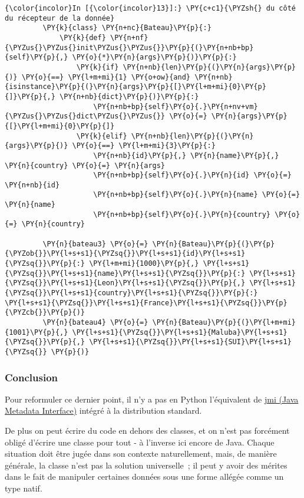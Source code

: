     \begin{Verbatim}[commandchars=\\\{\},frame=single,framerule=0.3mm,rulecolor=\color{cellframecolor}]
{\color{incolor}In [{\color{incolor}13}]:} \PY{c+c1}{\PYZsh{} du côté du récepteur de la donnée}
         \PY{k}{class} \PY{n+nc}{Bateau}\PY{p}{:}
             \PY{k}{def} \PY{n+nf}{\PYZus{}\PYZus{}init\PYZus{}\PYZus{}}\PY{p}{(}\PY{n+nb+bp}{self}\PY{p}{,} \PY{o}{*}\PY{n}{args}\PY{p}{)}\PY{p}{:}
                 \PY{k}{if} \PY{n+nb}{len}\PY{p}{(}\PY{n}{args}\PY{p}{)} \PY{o}{==} \PY{l+m+mi}{1} \PY{o+ow}{and} \PY{n+nb}{isinstance}\PY{p}{(}\PY{n}{args}\PY{p}{[}\PY{l+m+mi}{0}\PY{p}{]}\PY{p}{,} \PY{n+nb}{dict}\PY{p}{)}\PY{p}{:}
                     \PY{n+nb+bp}{self}\PY{o}{.}\PY{n+nv+vm}{\PYZus{}\PYZus{}dict\PYZus{}\PYZus{}} \PY{o}{=} \PY{n}{args}\PY{p}{[}\PY{l+m+mi}{0}\PY{p}{]}
                 \PY{k}{elif} \PY{n+nb}{len}\PY{p}{(}\PY{n}{args}\PY{p}{)} \PY{o}{==} \PY{l+m+mi}{3}\PY{p}{:}
                     \PY{n+nb}{id}\PY{p}{,} \PY{n}{name}\PY{p}{,} \PY{n}{country} \PY{o}{=} \PY{n}{args}
                     \PY{n+nb+bp}{self}\PY{o}{.}\PY{n}{id} \PY{o}{=} \PY{n+nb}{id}
                     \PY{n+nb+bp}{self}\PY{o}{.}\PY{n}{name} \PY{o}{=} \PY{n}{name}
                     \PY{n+nb+bp}{self}\PY{o}{.}\PY{n}{country} \PY{o}{=} \PY{n}{country}
         
         \PY{n}{bateau3} \PY{o}{=} \PY{n}{Bateau}\PY{p}{(}\PY{p}{\PYZob{}}\PY{l+s+s1}{\PYZsq{}}\PY{l+s+s1}{id}\PY{l+s+s1}{\PYZsq{}}\PY{p}{:} \PY{l+m+mi}{1000}\PY{p}{,} \PY{l+s+s1}{\PYZsq{}}\PY{l+s+s1}{name}\PY{l+s+s1}{\PYZsq{}}\PY{p}{:} \PY{l+s+s1}{\PYZsq{}}\PY{l+s+s1}{Leon}\PY{l+s+s1}{\PYZsq{}}\PY{p}{,} \PY{l+s+s1}{\PYZsq{}}\PY{l+s+s1}{country}\PY{l+s+s1}{\PYZsq{}}\PY{p}{:} \PY{l+s+s1}{\PYZsq{}}\PY{l+s+s1}{France}\PY{l+s+s1}{\PYZsq{}}\PY{p}{\PYZcb{}}\PY{p}{)}
         \PY{n}{bateau4} \PY{o}{=} \PY{n}{Bateau}\PY{p}{(}\PY{l+m+mi}{1001}\PY{p}{,} \PY{l+s+s1}{\PYZsq{}}\PY{l+s+s1}{Maluba}\PY{l+s+s1}{\PYZsq{}}\PY{p}{,} \PY{l+s+s1}{\PYZsq{}}\PY{l+s+s1}{SUI}\PY{l+s+s1}{\PYZsq{}} \PY{p}{)}
\end{Verbatim}


    \hypertarget{conclusion}{%
\subsubsection{Conclusion}\label{conclusion}}

    Pour reformuler ce dernier point, il n'y a pas en Python l'équivalent de
\href{https://en.wikipedia.org/wiki/Java_Metadata_Interface}{jmi (Java
Metadata Interface)} intégré à la distribution standard.

De plus on peut écrire du code en dehors des classes, et on n'est pas
forcément obligé d'écrire une classe pour tout - à l'inverse ici encore
de Java. Chaque situation doit être jugée dans son contexte
naturellement, mais, de manière générale, la classe n'est pas la
solution universelle~; il peut y avoir des mérites dans le fait de
manipuler certaines données sous une forme allégée comme un type natif.


    
    
    
